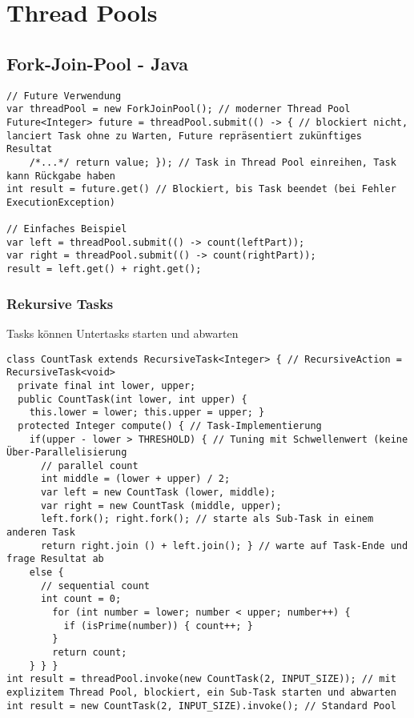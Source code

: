\section{Thread Pools}

\subsection{Fork-Join-Pool - Java}

\begin{lstlisting}
// Future Verwendung
var threadPool = new ForkJoinPool(); // moderner Thread Pool
Future<Integer> future = threadPool.submit(() -> { // blockiert nicht, lanciert Task ohne zu Warten, Future repräsentiert zukünftiges Resultat
    /*...*/ return value; }); // Task in Thread Pool einreihen, Task kann Rückgabe haben
int result = future.get() // Blockiert, bis Task beendet (bei Fehler ExecutionException)

// Einfaches Beispiel
var left = threadPool.submit(() -> count(leftPart));
var right = threadPool.submit(() -> count(rightPart));
result = left.get() + right.get();
\end{lstlisting}

\subsubsection{Rekursive Tasks}
Tasks können Untertasks starten und abwarten

\begin{lstlisting}
class CountTask extends RecursiveTask<Integer> { // RecursiveAction = RecursiveTask<void>
  private final int lower, upper;
  public CountTask(int lower, int upper) {
    this.lower = lower; this.upper = upper; }
  protected Integer compute() { // Task-Implementierung
    if(upper - lower > THRESHOLD) { // Tuning mit Schwellenwert (keine Über-Parallelisierung
      // parallel count
      int middle = (lower + upper) / 2;
      var left = new CountTask (lower, middle);
      var right = new CountTask (middle, upper);
      left.fork(); right.fork(); // starte als Sub-Task in einem anderen Task
      return right.join () + left.join(); } // warte auf Task-Ende und frage Resultat ab
    else {
      // sequential count
      int count = 0;
		for (int number = lower; number < upper; number++) {
		  if (isPrime(number)) { count++; }
		}
		return count;
    } } }
int result = threadPool.invoke(new CountTask(2, INPUT_SIZE)); // mit explizitem Thread Pool, blockiert, ein Sub-Task starten und abwarten
int result = new CountTask(2, INPUT_SIZE).invoke(); // Standard Pool
\end{lstlisting}

